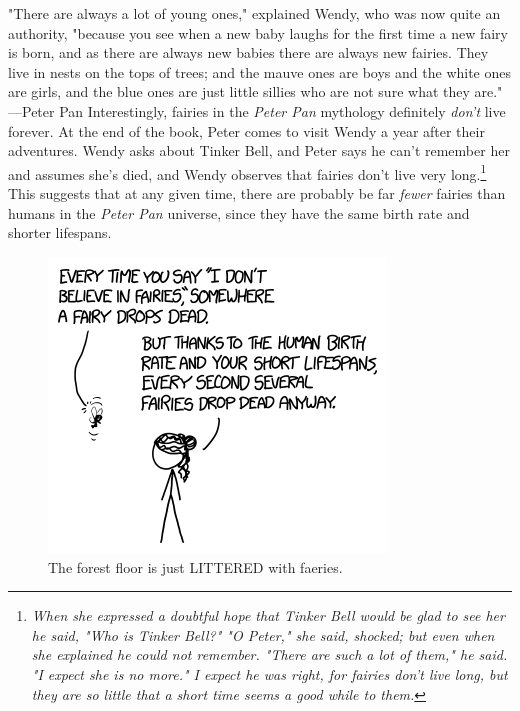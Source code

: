 {\hfill{}
"There are always a lot of young ones," explained Wendy, who was now quite an authority, "because you see when a new baby laughs for the first time a new fairy is born, and as there are always new babies there are always new fairies. They live in nests on the tops of trees; and the mauve ones are boys and the white ones are girls, and the blue ones are just little sillies who are not sure what they are."
—Peter Pan
{Interestingly, fairies in the \emph{Peter Pan} mythology definitely \emph{don't} live forever. At the end of the book, Peter comes to visit Wendy a year after their adventures. Wendy asks about Tinker Bell, and Peter says he can't remember her and assumes she's died, and Wendy observes that fairies don't live very long.{\footnote{ \emph{When she expressed a doubtful hope that Tinker Bell would be glad to see her he said, "Who is Tinker Bell?"\newline
"O Peter," she said, shocked; but even when she explained he could not remember.\newline
"There are such a lot of them," he said. "I expect she is no more."\newline
I expect he was right, for fairies don't live long, but they are so little that a short time seems a good while to them.} } } This suggests that at any given time, there are probably be far \emph{fewer} fairies than humans in the \emph{Peter Pan} universe, since they have the same birth rate and shorter lifespans.}

\begin{figure}[!htbp]
\centering
\includegraphics[scale=0.5, max width=0.8\textwidth]{imgs/a/123/deathrate.png}
\caption{The forest floor is just LITTERED with faeries.}
\end{figure}

}
